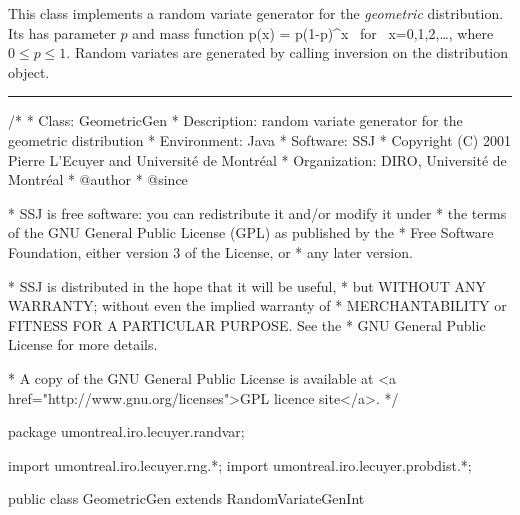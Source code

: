 
This class implements a random variate generator for the 
{\em geometric\/} distribution. Its has parameter $p$ and mass function
\eq
  p(x) = p(1-p)^x  \mbox{ for } x=0,1,2,\dots,   
\endeq
where $0\le p\le 1$.
Random variates are generated by calling inversion on the distribution object.

\bigskip\hrule

\begin{code}
\begin{hide}
/*
 * Class:        GeometricGen
 * Description:  random variate generator for the geometric distribution
 * Environment:  Java
 * Software:     SSJ 
 * Copyright (C) 2001  Pierre L'Ecuyer and Université de Montréal
 * Organization: DIRO, Université de Montréal
 * @author       
 * @since

 * SSJ is free software: you can redistribute it and/or modify it under
 * the terms of the GNU General Public License (GPL) as published by the
 * Free Software Foundation, either version 3 of the License, or
 * any later version.

 * SSJ is distributed in the hope that it will be useful,
 * but WITHOUT ANY WARRANTY; without even the implied warranty of
 * MERCHANTABILITY or FITNESS FOR A PARTICULAR PURPOSE.  See the
 * GNU General Public License for more details.

 * A copy of the GNU General Public License is available at
   <a href="http://www.gnu.org/licenses">GPL licence site</a>.
 */
\end{hide}
package umontreal.iro.lecuyer.randvar;\begin{hide}
import umontreal.iro.lecuyer.rng.*;
import umontreal.iro.lecuyer.probdist.*;
\end{hide}

public class GeometricGen extends RandomVariateGenInt \begin{hide} {
   private double p;
\end{hide}
\end{code}

